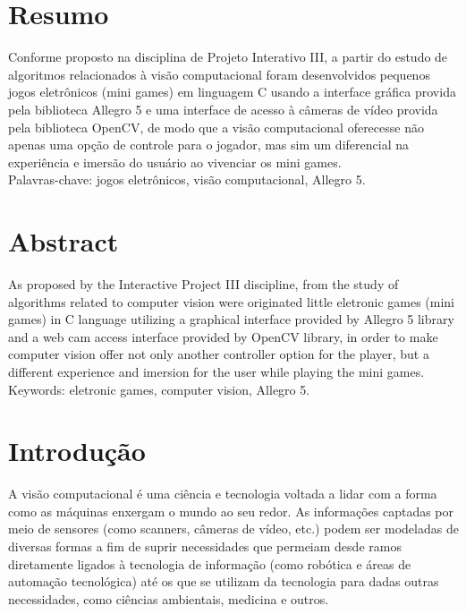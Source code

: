 \documentclass[a4paper]{article}
\begin{document}
\section{Resumo}


Conforme proposto na disciplina de Projeto Interativo III, a partir do estudo de algoritmos relacionados à visão computacional foram desenvolvidos pequenos jogos eletrônicos (mini games) em linguagem C usando a interface gráfica provida pela biblioteca Allegro 5 e uma interface de acesso à câmeras de vídeo provida pela biblioteca OpenCV, de modo que a visão computacional oferecesse não apenas uma opção de controle para o jogador, mas sim um diferencial na experiência e imersão do usuário ao vivenciar os mini games.\\

Palavras-chave: jogos eletrônicos, visão computacional, Allegro 5.\\  



\section{Abstract}


As proposed by the Interactive Project III discipline, from the study of algorithms related to computer vision were originated little eletronic games (mini games) in C language utilizing a graphical interface provided by Allegro 5 library and a web cam access interface provided by OpenCV library, in order to make computer vision offer not only another controller option for the player, but a different experience and imersion for the user while playing the mini games.\\

Keywords: eletronic games, computer vision, Allegro 5.\\



\section {Introdução}


A visão computacional é uma ciência e tecnologia voltada a lidar com a forma como as máquinas enxergam o mundo ao seu redor. As informações captadas por meio de sensores (como scanners, câmeras de vídeo, etc.) podem ser modeladas de diversas formas a fim de suprir necessidades que permeiam desde ramos diretamente ligados à tecnologia de informação (como robótica e áreas de automação tecnológica) até os que se utilizam da tecnologia para dadas outras necessidades, como ciências ambientais, medicina e outros.\\
\end{document}
